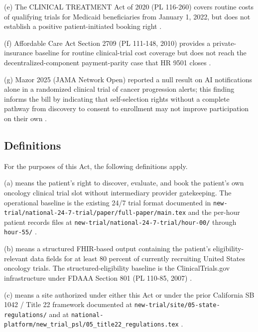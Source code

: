 (e) The CLINICAL TREATMENT Act of 2020 (PL 116-260) covers routine
costs of qualifying trials for Medicaid beneficiaries from January 1,
2022, but does not establish a positive patient-initiated booking
right \cite{rank2_clinical_treatment_act_2020}.

(f) Affordable Care Act Section 2709 (PL 111-148, 2010) provides a
private-insurance baseline for routine clinical-trial cost coverage
but does not reach the decentralized-component payment-parity case
that HR 9501 closes \cite{rank3_aca_clinical_trials_2010,
usc_300gg8_clinical_trials}.

(g) Mazor 2025 (JAMA Network Open) reported a null result on AI
notifications alone in a randomized clinical trial of cancer
progression alerts; this finding informs the bill by indicating that
self-selection rights without a complete pathway from discovery to
consent to enrollment may not improve participation on their own
\cite{mazor2025ai_notifications_trial}.

\subsection{Definitions}

For the purposes of this Act, the following definitions apply.

(a)  means the patient's right to
discover, evaluate, and book the patient's own oncology clinical
trial slot without intermediary provider gatekeeping. The operational
baseline is the existing 24/7 trial format documented in
\texttt{new-trial/national-24-7-trial/paper/full-paper/main.tex} and
the per-hour patient records files at
\texttt{new-trial/national-24-7-trial/hour-00/} through
\texttt{hour-55/} \cite{kawchak_2026_19994945}.

(b)  means a
structured FHIR-based output containing the patient's eligibility-
relevant data fields for at least 80 percent of currently recruiting
United States oncology trials. The structured-eligibility baseline
is the ClinicalTrials.gov infrastructure under FDAAA Section 801
(PL 110-85, 2007) \cite{rank5_fdaaa_2007}.

(c)  means a
site authorized under either this Act or under the prior California
SB 1042 / Title 22 framework documented at
\texttt{new-trial/site/05-state-regulations/} and at
\texttt{national-platform/new\_trial\_psl/05\_title22\_regulations.tex}
\cite{kawchak_2026_19176370, kawchak_2026_19244918}.

